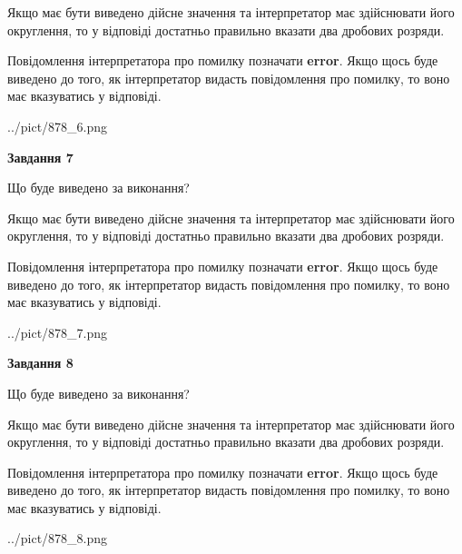 \documentclass[12pt, ukrainian]{article}
\begin{document}
{\begin {Large}
Якщо має бути виведено дійсне значення та інтерпретатор має здійснювати його округлення, 
то у відповіді достатньо правильно вказати два дробових розряди.

Повідомлення інтерпретатора про помилку позначати \textbf{error}.
Якщо щось буде виведено до того, як інтерпретатор видасть повідомлення про помилку, 
то воно має вказуватись у відповіді. \par

\begin{center}
	{../pict/878_6.png}
\end{center}
\newpage

{\begin {center}\textbf{Завдання 7}\end {center}}\par
Що буде виведено за виконання? \par

Якщо має бути виведено дійсне значення та інтерпретатор має здійснювати його округлення, 
то у відповіді достатньо правильно вказати два дробових розряди.

Повідомлення інтерпретатора про помилку позначати \textbf{error}.
Якщо щось буде виведено до того, як інтерпретатор видасть повідомлення про помилку, 
то воно має вказуватись у відповіді. \par

\begin{center}
	{../pict/878_7.png}
\end{center}
\newpage

{\begin {center}\textbf{Завдання 8}\end {center}}\par
Що буде виведено за виконання? \par

Якщо має бути виведено дійсне значення та інтерпретатор має здійснювати його округлення, 
то у відповіді достатньо правильно вказати два дробових розряди.

Повідомлення інтерпретатора про помилку позначати \textbf{error}.
Якщо щось буде виведено до того, як інтерпретатор видасть повідомлення про помилку, 
то воно має вказуватись у відповіді. \par

\begin{center}
	{../pict/878_8.png}
\end{center}
\newpage


\end{Large}}
\end{document}
